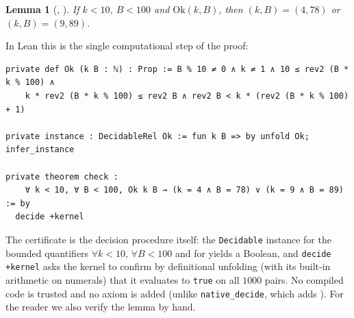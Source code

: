 \documentclass[11pt]{amsart}
\theoremstyle{plain}
\newtheorem{lemma}[theorem]{Lemma}
\theoremstyle{definition}
\begin{document}
\begin{lemma}[, ]\label{lem:check}
If $k<10$, $B<100$ and $\mathrm{Ok}(k,B)$, then $(k,B)=(4,78)$ or $(k,B)=(9,89)$.
\end{lemma}

In Lean this is the single computational step of the proof:
\begin{lstlisting}
private def Ok (k B : ℕ) : Prop := B % 10 ≠ 0 ∧ k ≠ 1 ∧ 10 ≤ rev2 (B * k % 100) ∧
    k * rev2 (B * k % 100) ≤ rev2 B ∧ rev2 B < k * (rev2 (B * k % 100) + 1)

private instance : DecidableRel Ok := fun k B => by unfold Ok; infer_instance

private theorem check :
    ∀ k < 10, ∀ B < 100, Ok k B → (k = 4 ∧ B = 78) ∨ (k = 9 ∧ B = 89) := by
  decide +kernel
\end{lstlisting}
The certificate is the decision procedure itself: the \texttt{Decidable} instance for the bounded quantifiers $\forall k<10$, $\forall B<100$ and for  yields a Boolean, and \texttt{decide +kernel} asks the kernel to confirm by definitional unfolding (with its built-in arithmetic on numerals) that it evaluates to \texttt{true} on all $1000$ pairs. No compiled code is trusted and no axiom is added (unlike \texttt{native\_decide}, which adds ). For the reader we also verify the lemma by hand.
\end{document}
